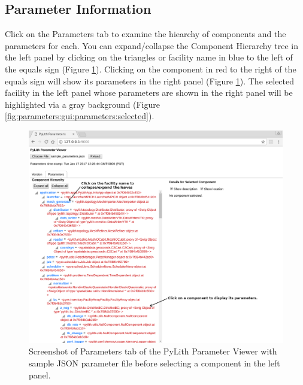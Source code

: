 \subsection{Parameter Information}

Click on the \textsf{Parameters} tab to examine the hiearchy of
components and the parameters for each. You can expand/collapse the
Component Hierarchy tree in the left panel by clicking on the
triangles or facility name in blue to the left of the equals sign
(Figure \ref{fig:parameters:gui:parameters:empty}).  Clicking on the
component in red to the right of the equals sign will show its
parameters in the right panel (Figure
\ref{fig:parameters:gui:parameters:empty}).  The selected facility in
the left panel whose parameters are shown in the right panel will be
highlighted via a gray background (Figure
\ref{fig:parameters:gui:parameters:selected}).

\begin{figure}[htbp]
  \includegraphics[width=5in]{runpylith/figs/paramgui_parameters} 
  \caption{Screenshot of \textsf{Parameters} tab of the PyLith Parameter Viewer
    with sample JSON parameter file before selecting a component in the
    left panel.}
  \label{fig:parameters:gui:parameters:empty}
\end{figure}


